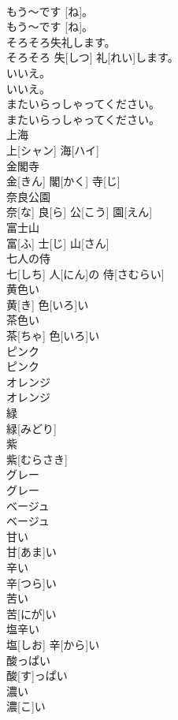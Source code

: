 \documentclass[8pt]{extreport}
\begin{document}
\begin{CJK}{UTF8}{min}
\\	もう～です [ね]。	
\\	もう～です [ね]。		
\\	そろそろ失礼します。	
\\	そろそろ 失[しつ] 礼[れい]します。		
\\	いいえ。	
\\	いいえ。		
\\	またいらっしゃってください。	
\\	またいらっしゃってください。		
\\	上海	
\\	上[シャン] 海[ハイ]		
\\	金閣寺	
\\	金[きん] 閣[かく] 寺[じ]		
\\	奈良公園	
\\	奈[な] 良[ら] 公[こう] 園[えん]		
\\	富士山	
\\	富[ふ] 士[じ] 山[さん]		
\\	七人の侍	
\\	七[しち] 人[にん]の 侍[さむらい]		
\\	黄色い	
\\	黄[き] 色[いろ]い		
\\	茶色い	
\\	茶[ちゃ] 色[いろ]い		
\\	ピンク	
\\	ピンク		
\\	オレンジ	
\\	オレンジ		
\\	緑	
\\	緑[みどり]		
\\	紫	
\\	紫[むらさき]		
\\	グレー	
\\	グレー		
\\	ベージュ	
\\	ベージュ		
\\	甘い	
\\	甘[あま]い		
\\	辛い	
\\	辛[つら]い		
\\	苦い	
\\	苦[にが]い		
\\	塩辛い	
\\	塩[しお] 辛[から]い		
\\	酸っぱい	
\\	酸[す]っぱい		
\\	濃い	
\\	濃[こ]い		

\end{CJK}
\end{document}
